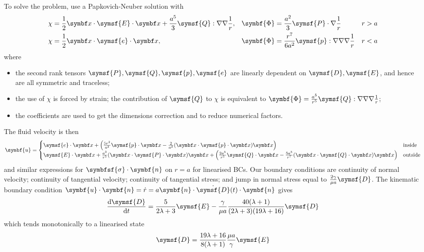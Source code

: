 \documentclass{jknotes}
\begin{document}
To solve the problem, use a Papkovich-Neuber solution with
\begin{align}
	&\chi = \frac{1}{2} \x \cdot \symsf{E}\cdot\x + \frac{a^5}{3}
	\symsf{Q}:\nabla\nabla\inv{r}, &&\symbf{\Phi} = \frac{a^2}{3}
	\symsf{P}\cdot \nabla \inv{r} && r > a \\
	&\chi = \frac{1}{2}\x\cdot\symsf{e}\cdot\x, && \symbf{\Phi} =
	\frac{r^7}{6a^2} \symsf{p}:\nabla\nabla\nabla\inv{r} && r < a
\end{align}
where
\begin{itemize}
	\item the second rank tensors $\symsf{P},\symsf{Q},\symsf{p},\symsf{e}$
		are linearly dependent on $\symsf{D}, \symsf{E}$, and hence are all
		symmetric and traceless;
	\item the use of $\chi$ is forced by strain; the contribution of
		$\symsf{Q}$ to $\chi$ is equivalent to $\symbf{\Phi} = \frac{a^5}{r^5}
		\symsf{Q}:\nabla\nabla\nabla\inv{r}$;
	\item the coefficients are used to get the dimensions correction and to
		reduce numerical factors.
\end{itemize}

The fluid velocity is then
\begin{equation}
	\symbf{u} = \begin{cases}
		\symsf{e}\cdot\x + \left(\frac{5r^2}{a^2}\symsf{p}\cdot\x -
		\frac{2}{a^2} (\x\cdot\symsf{p}\cdot\x)\x\right) & \text{inside} \\
		\symsf{E}\cdot\x + \frac{a^3}{r^5}(\x\cdot\symsf{P}\cdot\x)\x + \left(
			\frac{2a^5}{r^5}\symsf{Q}\cdot\x -
			\frac{5a^5}{r^7}(\x\cdot\symsf{Q}\cdot\x)\x\right) &
			\text{outside}
	\end{cases}
\end{equation}
and similar expressions for $\symbfsf{\sigma}\cdot\symbf{n}$ on $r=a$ for
linearised BCs. Our boundary conditions are continuity of normal velocity;
continuity of tangential velocity; continuity of tangential stress; and jump
in normal stress equal to $\frac{2\gamma}{\mu a} \symsf{D}$. The kinematic
boundary condition $\symbf{u}\cdot\symbf{n} = \dot{r} = a \symbf{n} \cdot
\dot{\symsf{D}}(t)\cdot\symbf{n}$ gives
\begin{equation}
	\frac{\diffd \symsf{D}}{\diffd t} = \frac{5}{2\lambda+3}\symsf{E} -
	\frac{\gamma}{\mu a}
	\frac{40(\lambda+1)}{(2\lambda+3)(19\lambda+16)}\symsf{D}
\end{equation}
which tends monotonically to a linearised state
\begin{equation}
	\symsf{D} = \frac{19\lambda+16}{8(\lambda+1)} \frac{\mu a}{\gamma}
	\symsf{E}
\end{equation}
\end{document}
